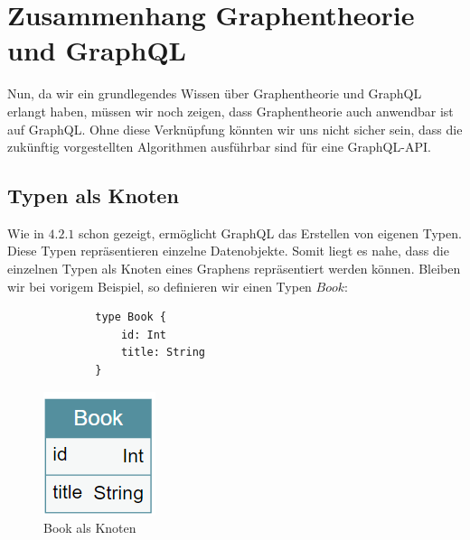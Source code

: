 \section{Zusammenhang Graphentheorie und GraphQL}

Nun, da wir ein grundlegendes Wissen über Graphentheorie und GraphQL erlangt haben, müssen wir noch zeigen,
dass Graphentheorie auch anwendbar ist auf GraphQL. Ohne diese Verknüpfung könnten wir uns nicht sicher sein,
dass die zukünftig vorgestellten Algorithmen ausführbar sind für eine GraphQL-API.

\subsection{Typen als Knoten}

Wie in $4.2.1$ schon gezeigt, ermöglicht GraphQL das Erstellen von eigenen Typen.
Diese Typen repräsentieren einzelne Datenobjekte.
Somit liegt es nahe, dass die einzelnen Typen als Knoten eines Graphens repräsentiert werden können.
Bleiben wir bei vorigem Beispiel, so definieren wir einen Typen $Book$:

\begin{figure}[ht]
    \centering
    \begin{minipage}[b]{0.4\textwidth}
        \begin{verbatim}
        type Book {
            id: Int
            title: String
        }
        \end{verbatim}
    \end{minipage}
    \hfill
    \begin{minipage}[b]{0.4\textwidth}
        \centering
        \includegraphics[width=\textwidth,height=\textheight,keepaspectratio]{img/book}
        \caption{Book als Knoten}
        \label{fig:mein_bild}
    \end{minipage}
\end{figure}

